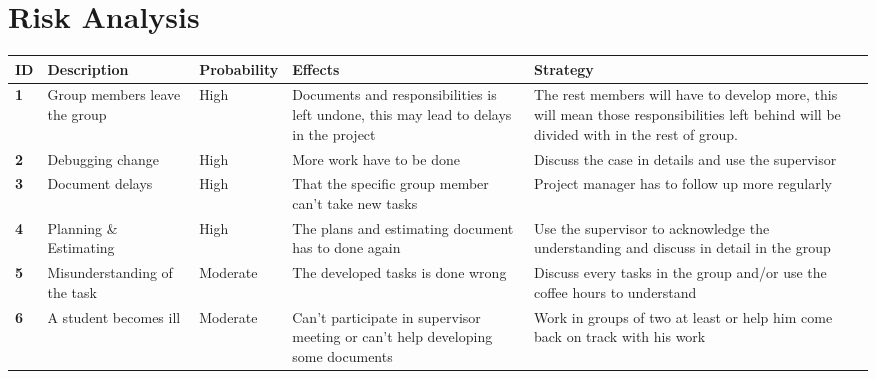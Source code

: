 \renewcommand{\headrulewidth}{0.1pt}
\renewcommand{\footrulewidth}{0.1pt}

\section*{Risk Analysis}

\begin{center}
	\def\arraystretch{1.5}%
    \begin{tabular}{ | l | p{4cm} | l | p{4cm} | p{4cm} |}
    \hline
    	\textbf{ID} & \textbf{Description} & \textbf{Probability} & \textbf{Effects} & \textbf{Strategy} \\ \hline
		
		\textbf{1} & Group members leave the group & High & Documents and responsibilities is left undone, this may lead to delays in the project & The rest members will have to develop more, this will mean those responsibilities left behind will be divided with in the rest of group. \\ \hline
		
		\textbf{2} & Debugging change & High & More work have to be done & Discuss the case in details and use the supervisor \\ \hline
		
		\textbf{3} & Document delays & High & That the specific group member can’t take new tasks & Project manager has to follow up more regularly \\ \hline
		
		\textbf{4} & Planning \& Estimating & High & The plans and estimating document has to done again & Use the supervisor to acknowledge the understanding and discuss in detail in the group \\ \hline
		
		\textbf{5} & Misunderstanding of the task & Moderate & The developed tasks is done wrong & Discuss every tasks in the group and/or use the coffee hours to understand \\ \hline
		
		\textbf{6} & A student becomes ill  & Moderate & Can’t participate in supervisor meeting or can’t help developing some documents & Work in groups of two at least or help him come back on track with his work \\ \hline
		

\end{tabular}
\end{center}
